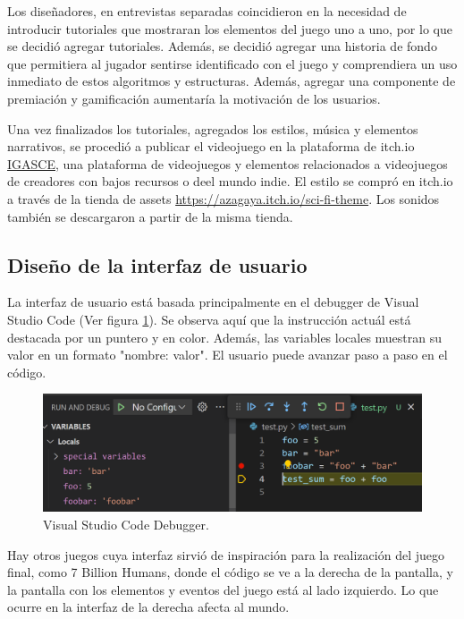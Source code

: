 Los diseñadores, en entrevistas separadas coincidieron en la necesidad de introducir tutoriales que mostraran los elementos del juego uno a uno, por lo que se decidió agregar tutoriales. Además, se decidió agregar una historia de fondo que permitiera al jugador sentirse identificado con el juego y comprendiera un uso inmediato de estos algoritmos y estructuras. Además, agregar una componente de premiación y gamificación aumentaría la motivación de los usuarios.

Una vez finalizados los tutoriales, agregados los estilos, música y elementos narrativos, se procedió a publicar el videojuego en la plataforma de itch.io \href{https://alasaltum.itch.io/igasce}{IGASCE}, una plataforma de videojuegos y elementos relacionados a videojuegos de creadores con bajos recursos o deel mundo indie. El estilo se compró en itch.io a través de la tienda de assets \url{https://azagaya.itch.io/sci-fi-theme}. Los sonidos también se descargaron a partir de la misma tienda.


\subsection{Diseño de la interfaz de usuario}

La interfaz de usuario está basada principalmente en el debugger de Visual Studio Code (Ver figura \ref{VScodeDebugger}). Se observa aquí que la instrucción actuál está destacada por un puntero y en color. Además, las variables locales muestran su valor en un formato "nombre: valor". El usuario puede avanzar paso a paso en el código.

\begin{figure}[h]
	\centering
	\includegraphics[scale=0.3]{imagenes/VScodeDebugger.png}
	\caption{Visual Studio Code Debugger.}
	\label{VScodeDebugger}
\end{figure}

Hay otros juegos cuya interfaz sirvió de inspiración para la realización del juego final, como 7 Billion Humans, donde el código se ve a la derecha de la pantalla, y la pantalla con los elementos y eventos del juego está al lado izquierdo. Lo que ocurre en la interfaz de la derecha afecta al mundo.

